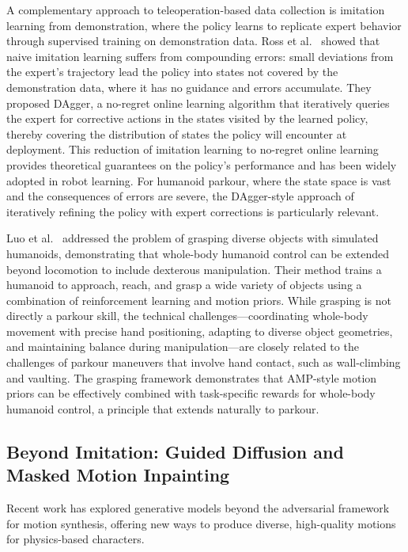 A complementary approach to teleoperation-based data collection is imitation learning from demonstration, where the policy learns to replicate expert behavior through supervised training on demonstration data. Ross et al.~\cite{ross2024reduction} showed that naive imitation learning suffers from compounding errors: small deviations from the expert's trajectory lead the policy into states not covered by the demonstration data, where it has no guidance and errors accumulate. They proposed DAgger, a no-regret online learning algorithm that iteratively queries the expert for corrective actions in the states visited by the learned policy, thereby covering the distribution of states the policy will encounter at deployment. This reduction of imitation learning to no-regret online learning provides theoretical guarantees on the policy's performance and has been widely adopted in robot learning. For humanoid parkour, where the state space is vast and the consequences of errors are severe, the DAgger-style approach of iteratively refining the policy with expert corrections is particularly relevant.

Luo et al.~\cite{luo2024grasping} addressed the problem of grasping diverse objects with simulated humanoids, demonstrating that whole-body humanoid control can be extended beyond locomotion to include dexterous manipulation. Their method trains a humanoid to approach, reach, and grasp a wide variety of objects using a combination of reinforcement learning and motion priors. While grasping is not directly a parkour skill, the technical challenges---coordinating whole-body movement with precise hand positioning, adapting to diverse object geometries, and maintaining balance during manipulation---are closely related to the challenges of parkour maneuvers that involve hand contact, such as wall-climbing and vaulting. The grasping framework demonstrates that AMP-style motion priors can be effectively combined with task-specific rewards for whole-body humanoid control, a principle that extends naturally to parkour.

\subsection{Beyond Imitation: Guided Diffusion and Masked Motion Inpainting}

Recent work has explored generative models beyond the adversarial framework for motion synthesis, offering new ways to produce diverse, high-quality motions for physics-based characters.

